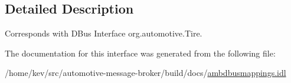 \subsection{Detailed Description}
Corresponds with D\+Bus Interface org.\+automotive.\+Tire. 

The documentation for this interface was generated from the following file\+:\begin{DoxyCompactItemize}
\item 
/home/kev/src/automotive-\/message-\/broker/build/docs/\hyperlink{ambdbusmappings_8idl}{ambdbusmappings.\+idl}\end{DoxyCompactItemize}
